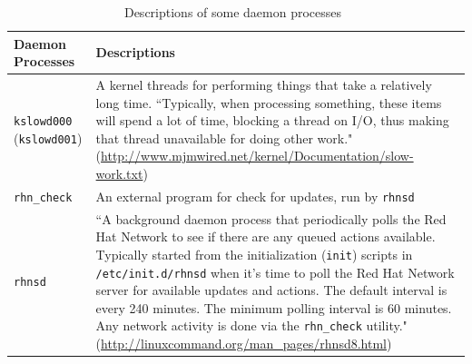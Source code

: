 \documentclass[10pt]{article}
\begin{document}
\begin{table}[H]
\centering
{
 \begin{tabular}{|l|p{7cm}|} \hline
Daemon Processes  & Descriptions\\ \hline
{\tt kslowd000} ({\tt kslowd001}) & A kernel threads for performing things that take a relatively long time. ``Typically, when processing something, these items will spend a lot of time, blocking a thread on I/O, thus making that thread unavailable for doing other work." (\url{http://www.mjmwired.net/kernel/Documentation/slow-work.txt})\\ \hline
{\tt rhn\_check} & An external program for check for updates, run by {\tt rhnsd}\\ \hline 
{\tt rhnsd} & ``A background daemon process that periodically polls the Red Hat Network to see if there are any queued actions available. Typically started from the initialization ({\tt init}) scripts in {\tt /etc/init.d/rhnsd}  when it’s time to poll the Red Hat Network server for available updates and actions. The default interval is every 240 minutes. The minimum polling interval is 60 minutes. 
Any network  activity  is  done  via  the {\tt rhn\_check} utility." (\url{http://linuxcommand.org/man_pages/rhnsd8.html})
       \\ \hline 
  \end{tabular}
  }
 \caption{Descriptions of some daemon processes~\label{fig:daemon_desc}}
\end{table}
\end{document}
